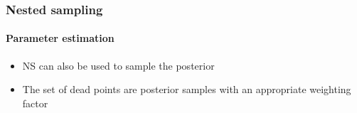 \documentclass[%
]{beamer}
\newcommand{\lik}{\mathcal{L}}
\newcommand{\ev}{\mathcal{Z}}
\begin{document}
%
% 
%
%
%
%
%


\begin{frame}
  \frametitle{Nested sampling} 
  \framesubtitle{Parameter estimation} 

  \begin{itemize}
      \pause
    \item NS can also be used to sample the posterior
      \pause
    \item The set of dead points are posterior samples with an appropriate weighting factor
  \end{itemize}
 
\end{frame}
\end{document}

